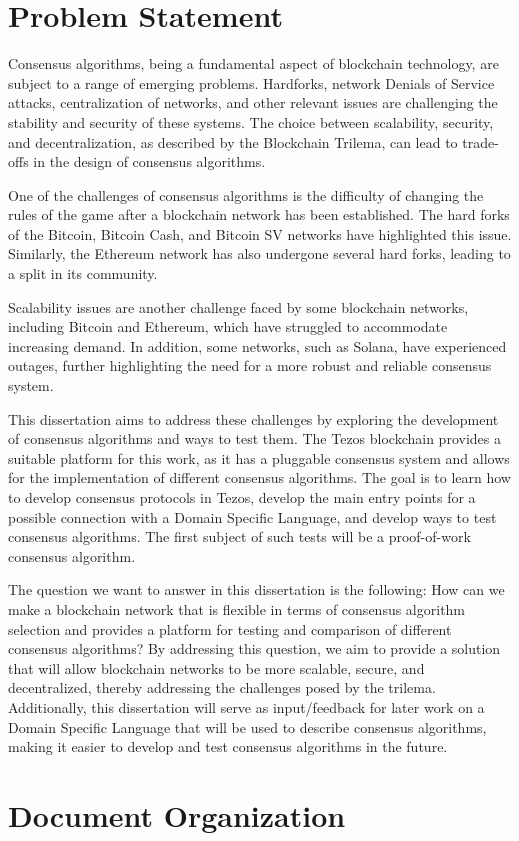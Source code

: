 \section{Problem Statement}
Consensus algorithms, being a fundamental aspect of blockchain technology, are subject to a range of emerging problems. Hardforks, network Denials of Service attacks, centralization of networks, and other relevant issues are challenging the stability and security of these systems. The choice between scalability, security, and decentralization, as described by the Blockchain Trilema, can lead to trade-offs in the design of consensus algorithms.

One of the challenges of consensus algorithms is the difficulty of changing the rules of the game after a blockchain network has been established. The hard forks of the Bitcoin, Bitcoin Cash, and Bitcoin SV networks have highlighted this issue. Similarly, the Ethereum network has also undergone several hard forks, leading to a split in its community.

Scalability issues are another challenge faced by some blockchain networks, including Bitcoin and Ethereum, which have struggled to accommodate increasing demand. In addition, some networks, such as Solana, have experienced outages, further highlighting the need for a more robust and reliable consensus system.

This dissertation aims to address these challenges by exploring the development of consensus algorithms and ways to test them. The Tezos blockchain provides a suitable platform for this work, as it has a pluggable consensus system and allows for the implementation of different consensus algorithms. The goal is to learn how to develop consensus protocols in Tezos, develop the main entry points for a possible connection with a Domain Specific Language, and develop ways to test consensus algorithms. 
The first subject of such tests will be a proof-of-work consensus algorithm.

The question we want to answer in this dissertation is the following: How can we make a blockchain network that is flexible in terms of consensus algorithm selection and provides a platform for testing and comparison of different consensus algorithms? By addressing this question, we aim to provide a solution that will allow blockchain networks to be more scalable, secure, and decentralized, thereby addressing the challenges posed by the trilema. Additionally, this dissertation will serve as input/feedback for later work on a Domain Specific Language that will be used to describe consensus algorithms, making it easier to develop and test consensus algorithms in the future.

\section{Document Organization}
